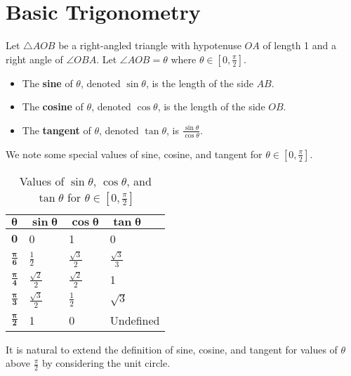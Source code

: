 \section{Basic Trigonometry}

\begin{definition}
    Let $\triangle AOB$ be a right-angled triangle with hypotenuse $OA$ of length 1 and a right angle of $\angle OBA$. Let $\angle AOB = \theta$ where $\theta \in [0, \frac\pi2]$.
    \begin{itemize}
        \item The \textbf{sine} of $\theta$, denoted $\sin\theta$, is the length of the side $AB$.
        \item The \textbf{cosine} of $\theta$, denoted $\cos\theta$, is the length of the side $OB$.
        \item The \textbf{tangent} of $\theta$, denoted $\tan\theta$, is $\frac{\sin\theta}{\cos\theta}$.
    \end{itemize}
\end{definition}

We note some special values of sine, cosine, and tangent for $\theta \in [0, \frac\pi2]$.

\begin{table}[H]
    \centering
    \begin{tabular}{|l|l|l|l|}
        \hline
        $\boldsymbol{\theta}$ & $\boldsymbol{\sin\theta}$ & $\boldsymbol{\cos\theta}$ & $\boldsymbol{\tan\theta}$ \\ \hline
        $\boldsymbol{0}$ & 0 & 1 & 0 \\ \hline
        $\boldsymbol{\frac\pi6}$ & $\frac12$ & $\frac{\sqrt3}2$ & $\frac{\sqrt3}3$ \\ \hline
        $\boldsymbol{\frac\pi4}$ & $\frac{\sqrt2}2$ & $\frac{\sqrt2}2$ & 1 \\ \hline
        $\boldsymbol{\frac\pi3}$ & $\frac{\sqrt3}2$ & $\frac12$ & $\sqrt3$ \\ \hline
        $\boldsymbol{\frac\pi2}$ & 1 & 0 & Undefined \\ \hline
    \end{tabular}
    \caption{Values of $\sin\theta$, $\cos\theta$, and $\tan\theta$ for $\theta \in [0, \frac\pi2]$}
\end{table}

It is natural to extend the definition of sine, cosine, and tangent for values of $\theta$ above $\frac\pi2$ by considering the unit circle.

